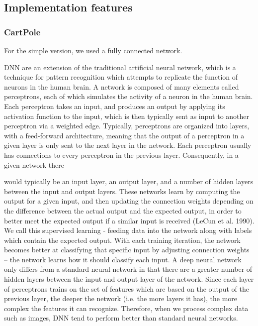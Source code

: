 \documentclass[12pt,a4paper]{article}
\begin{document}
\subsection{Implementation features}
\subsubsection{CartPole}
For the simple version, we used a fully connected network.

DNN are an extension of the traditional artificial neural network, which is a
technique for pattern recognition which attempts to replicate the function of neurons in the
human brain. A network is composed of many elements called perceptrons, each of which
simulates the activity of a neuron in the human brain. Each perceptron takes an input, and
produces an output by applying its activation function to the input, which is then typically
sent as input to another perceptron via a weighted edge. Typically, perceptrons are organized
into layers, with a feed-forward architecture, meaning that the output of a perceptron in a
given layer is only sent to the next layer in the network. Each perceptron usually has
connections to every perceptron in the previous layer. Consequently, in a given network there 

would typically be an input layer, an output layer, and a number of hidden layers between the
input and output layers. These networks learn by computing the output for a given input, and
then updating the connection weights depending on the difference between the actual output
and the expected output, in order to better meet the expected output if a similar input is
received (LeCun et al. 1990). We call this supervised learning - feeding data into the network
along with labels which contain the expected output. With each training iteration, the network
becomes better at classifying that specific input by adjusting connection weights – the
network learns how it should classify each input.
A deep neural network only differs from a standard neural network in that there are a
greater number of hidden layers between the input and output layer of the network. Since
each layer of perceptrons trains on the set of features which are based on the output of the
previous layer, the deeper the network (i.e. the more layers it has), the more complex the
features it can recognize. Therefore, when we process complex data such as images, DNN
tend to perform better than standard neural networks. 
\end{document}
